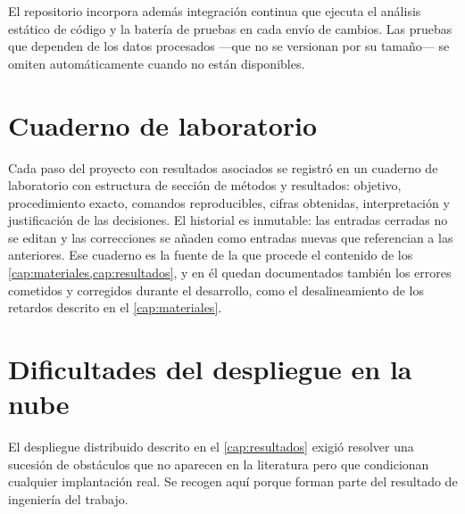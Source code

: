 El repositorio incorpora además integración continua que ejecuta el análisis estático de código y la
batería de pruebas en cada envío de cambios. Las pruebas que dependen de los datos procesados —que
no se versionan por su tamaño— se omiten automáticamente cuando no están disponibles.

\section{Cuaderno de laboratorio}

Cada paso del proyecto con resultados asociados se registró en un cuaderno de laboratorio con
estructura de sección de métodos y resultados: objetivo, procedimiento exacto, comandos
reproducibles, cifras obtenidas, interpretación y justificación de las decisiones. El historial es
inmutable: las entradas cerradas no se editan y las correcciones se añaden como entradas nuevas que
referencian a las anteriores. Ese cuaderno es la fuente de la que procede el contenido de los
\cref{cap:materiales,cap:resultados}, y en él quedan documentados también los errores cometidos y
corregidos durante el desarrollo, como el desalineamiento de los retardos descrito en el
\cref{cap:materiales}.

\section{Dificultades del despliegue en la nube}

El despliegue distribuido descrito en el \cref{cap:resultados} exigió resolver una sucesión de
obstáculos que no aparecen en la literatura pero que condicionan cualquier implantación real. Se
recogen aquí porque forman parte del resultado de ingeniería del trabajo.

